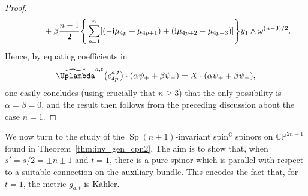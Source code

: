 \documentclass[pdftex]{sigma}
\numberwithin{equation}{section}
\DeclareMathOperator{\Sp}{Sp}
\begin{document}
\begin{proof}
\begin{gather*}
				\phantom{\qquad=}{}+ \beta \frac{n-1}{2} \Bigg\{ \sum_{p=1}^n[(-{\rm i} \mu_{4p} + \mu_{4p+1}) + ({\rm i} \mu_{4p+2}-\mu_{4p+3}) ] \Bigg\} y_1 \wedge \omega^{(n-3)/2} .
			\end{gather*}
			Hence, by equating coefficients in
			\begin{equation*}
				\widetilde{\Uplambda}^{a,t} \bigl( e_{4p}^{a,t} \bigr) \cdot ( \alpha \psi_+ + \beta \psi_- ) = X \cdot ( \alpha \psi_+ + \beta \psi_- ) ,
			\end{equation*}
			one easily concludes (using crucially that $n \geq 3$) that the only possibility is $\alpha = \beta = 0$, and the result then follows from the preceding discussion about the case $n=1$.
		\end{proof}
		
		We now turn to the study of the $\Sp(n+1)$-invariant spin$^{\mathbb{C}}$ spinors on $\mathbb{CP}^{2n+1}$ found in Theorem~\ref{thm:inv_gen_cpn2}. The aim is to show that, when $s' = s/2 = \pm n \pm 1$ and $t=1$, there is a pure spinor which is parallel with respect to a suitable connection on the auxiliary bundle. This encodes the fact that, for $t=1$, the metric $g_{a,t}$ is K\"{a}hler.
		
\end{document}
